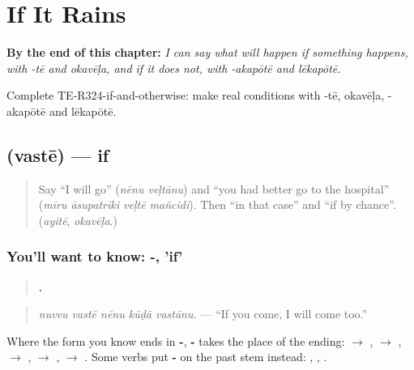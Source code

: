 
\chapter{If It Rains}
\label{ch:te-if-it-rains}

\begin{chapteropening}
\textbf{By the end of this chapter:} \emph{I can say what will happen if something happens, with -tē and okavēḷa, and if it does not, with -akapōtē and lēkapōtē.}

Complete TE-R324-if-and-otherwise: make real conditions with -tē, okavēḷa, -akapōtē and lēkapōtē.
\end{chapteropening}

\section[\texorpdfstring{\te{వస్తే} (vastē)}{వస్తే (vastē)}]{ (vastē) — if}

\label{lesson:TE-C324-vaste}



\begin{quote}
Say \textquotedblleft{}I will go\textquotedblright{} (\emph{nēnu veḷtānu}) and \textquotedblleft{}you had better go to the hospital\textquotedblright{} (\emph{mīru āsupatriki veḷtē mañcidi}). Then \textquotedblleft{}in that case\textquotedblright{} and \textquotedblleft{}if by chance\textquotedblright{}. (\emph{ayitē}, \emph{okavēḷa}.)
\end{quote}

\subsection*{You'll want to know: -, 'if'}
\begin{quote}
\textbf{    .}
\end{quote}

\begin{quote}
\emph{nuvvu vastē nēnu kūḍā vastānu.} — \textquotedblleft{}If you come, I will come too.\textquotedblright{}
\end{quote}

Where the form you know ends in \textbf{-}, \textbf{-} takes the place of the ending: \textbf{} $\to$ \textbf{}, \textbf{} $\to$ \textbf{}, \textbf{} $\to$ \textbf{}, \textbf{} $\to$ \textbf{}, \textbf{} $\to$ \textbf{}. Some verbs put \textbf{-} on the past stem instead: \textbf{}, \textbf{}, \textbf{}.

